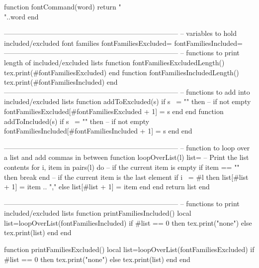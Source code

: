 \begin{luacode}
    function fontCommand(word)
        return "\\"..word
    end
\end{luacode}
\newcommand{\fontCmd}[1]{%
    \directlua{tex.print(fontCommand("#1"))}%
}


\begin{luacode}
    ---------------------------------------------------------------------------
    -- variables to hold included/excluded font families
    fontFamiliesExcluded={}
    fontFamiliesIncluded={}
    ---------------------------------------------------------------------------
    -- functions to print length of included/excluded lists
    function fontFamiliesExcludedLength()
        tex.print(#fontFamiliesExcluded)
    end
    function fontFamiliesIncludedLength()
        tex.print(#fontFamiliesIncluded)
    end
    ---------------------------------------------------------------------------
    -- functions to add into included/excluded lists
    function addToExcluded(s)
        if s ~= "" then -- if not empty
            fontFamiliesExcluded[#fontFamiliesExcluded + 1] = s
        end
    end
    function addToIncluded(s)
        if s ~= "" then -- if not empty
            fontFamiliesIncluded[#fontFamiliesIncluded + 1] = s
        end
    end

    ---------------------------------------------------------------------------
    -- function to loop over a list and add commas in between
    function loopOverList(l)
        list={}
        -- Print the list contents
        for i, item in pairs(l) do
            -- if the current item is empty
            if item == "" then
                break
            end
            -- if the current item is the last element
            if i ~= #l then
                list[#list + 1] = item .. ","
            else
                list[#list + 1] = item
            end
        end
        return list
    end

    ---------------------------------------------------------------------------
    -- functions to print included/excluded lists
    function printFamiliesIncluded()
        local list=loopOverList(fontFamiliesIncluded)
        if #list == 0 then
            tex.print("none")
        else
            tex.print(list)
        end
    end

    function printFamiliesExcluded()
        local list=loopOverList(fontFamiliesExcluded)
        if #list == 0 then
            tex.print("none")
        else
            tex.print(list)
        end
    end

\end{luacode}

